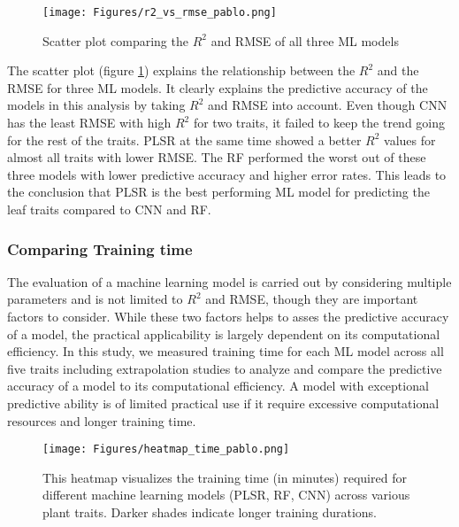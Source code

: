\documentclass[12pt,a4paper]{report}
\begin{document}
\begin{figure}[h]
    \centering
    \texttt{[image: Figures/r2\_vs\_rmse\_pablo.png]}
    \caption{Scatter plot comparing the $R^2$ and RMSE of all three ML models}
    \label{fig:r2_vs_rmse_pablo}
\end{figure}

The scatter plot (figure \ref{fig:r2_vs_rmse_pablo}) explains the relationship between the $R^2$ and the RMSE for three ML models. It clearly explains the predictive accuracy of the models in this analysis by taking $R^2$ and RMSE into account. Even though CNN has the least RMSE  with high $R^2$ for two traits, it failed to keep the trend going for the rest of the traits. PLSR at the same time showed a better $R^2$ values for almost all traits with lower RMSE. The RF performed the worst out of these three models with lower predictive accuracy and higher error rates. This leads to the conclusion that PLSR is the best performing ML model for predicting the leaf traits compared to CNN and RF. \\

\subsubsection*{Comparing Training time}
The evaluation of a machine learning model is carried out by considering multiple parameters and is not  limited to $R^2$ and RMSE, though they are important factors to consider. While these two factors helps to asses the predictive accuracy of a model, the practical applicability is largely dependent on its computational efficiency. In this study, we measured training time for each ML model across all five traits including extrapolation studies to analyze and compare the predictive accuracy of a model to its computational efficiency. A model with exceptional predictive ability is of limited practical use if it require excessive computational resources and longer training time. \\


\begin{figure}[h]
    \centering
    \texttt{[image: Figures/heatmap\_time\_pablo.png]}
    \caption{This heatmap visualizes the training time (in minutes) required for different machine learning models (PLSR, RF, CNN) across various plant traits. Darker shades indicate longer training durations.}
    \label{fig:heatmap_time_pablo}
\end{figure}
\end{document}
